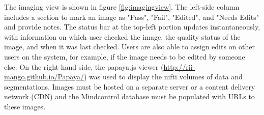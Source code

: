 The imaging view is shown in figure \ref{fig:imagingview}. The left-side column includes a section to mark an image as "Pass", "Fail", "Edited", and "Needs Edits" and provide notes. The status bar at the top-left portion updates instantaneously, with information on which user checked the image, the quality status of the image, and when it was last checked. Users are also able to assign edits on other users on the system, for example, if the image needs to be edited by someone else. On the right hand side, the papaya.js viewer (\href{http://rii-mango.github.io/Papaya/}{http://rii-mango.github.io/Papaya/}) was used to display the nifti volumes of data and segmentations. Images must be hosted on a separate server or a content delivery network (CDN) and the Mindcontrol database must be populated with URLs to these images.
